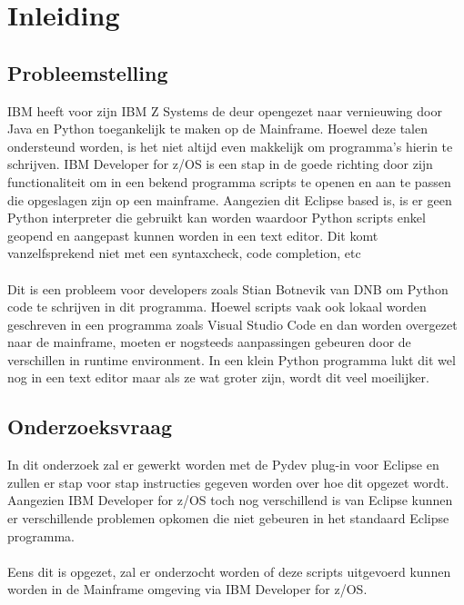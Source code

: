
\chapter{Inleiding}%
\label{ch:inleiding}

\section{Probleemstelling}%
\label{sec:probleemstelling}
IBM heeft voor zijn IBM Z Systems de deur opengezet naar vernieuwing door Java en Python toegankelijk te maken op de Mainframe. Hoewel deze talen ondersteund worden, is het niet altijd even makkelijk om programma's hierin te schrijven. IBM Developer for z/OS is een stap in de goede richting door zijn functionaliteit om in een bekend programma scripts te openen en aan te passen die opgeslagen zijn op een mainframe. Aangezien dit Eclipse based is, is er geen Python interpreter die gebruikt kan worden waardoor Python scripts enkel geopend en aangepast kunnen worden in een text editor. Dit komt vanzelfsprekend niet met een syntaxcheck, code completion, etc \\ \\
Dit is een probleem voor developers zoals Stian Botnevik van DNB om Python code te schrijven in dit programma. Hoewel scripts vaak ook  lokaal worden geschreven in een programma zoals Visual Studio Code en dan worden overgezet naar de mainframe, moeten er nogsteeds aanpassingen gebeuren door de verschillen in runtime environment. In een klein Python programma lukt dit wel nog in een text editor maar als ze wat groter zijn, wordt dit veel moeilijker.


\section{Onderzoeksvraag}%
\label{sec:onderzoeksvraag}

In dit onderzoek zal er gewerkt worden met de Pydev plug-in voor Eclipse en zullen er stap voor stap instructies gegeven worden over hoe dit opgezet wordt. Aangezien IBM Developer for z/OS toch nog verschillend is van Eclipse kunnen er verschillende problemen opkomen die niet gebeuren in het standaard Eclipse programma. \\ \\
Eens dit is opgezet, zal er onderzocht worden of deze scripts uitgevoerd kunnen worden  in de Mainframe omgeving via IBM Developer for z/OS.


